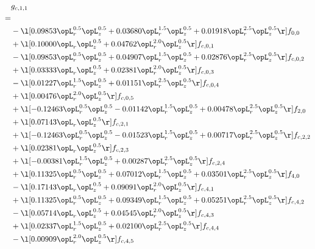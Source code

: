 \begin{alignat}{2} 
\label{eq:g_11_0} 
& g_{c,1,1} \nonumber \\ 
 = \\ 
& - \l[  0.09853 \opL_r^{0.5} \opL_z^{0.5} +  0.03680 \opL_r^{1.5} \opL_z^{0.5} +  0.01918 \opL_r^{2.5} \opL_z^{0.5}  \r] f_{0,0} \nonumber \\ 
& + \l[  0.10000 \opL_r \opL_z^{0.5} +  0.04762 \opL_r^{2.0} \opL_z^{0.5}  \r] f_{c,0,1} \nonumber \\ 
& - \l[  0.09853 \opL_r^{0.5} \opL_z^{0.5} +  0.04907 \opL_r^{1.5} \opL_z^{0.5} +  0.02876 \opL_r^{2.5} \opL_z^{0.5}  \r] f_{c,0,2} \nonumber \\ 
& + \l[  0.03333 \opL_r \opL_z^{0.5} +  0.02381 \opL_r^{2.0} \opL_z^{0.5}  \r] f_{c,0,3} \nonumber \\ 
& - \l[  0.01227 \opL_r^{1.5} \opL_z^{0.5} +  0.01151 \opL_r^{2.5} \opL_z^{0.5}  \r] f_{c,0,4} \nonumber \\ 
& + \l[  0.00476 \opL_r^{2.0} \opL_z^{0.5}  \r] f_{c,0,5} \nonumber \\ 
& + \l[  -0.12463 \opL_r^{0.5} \opL_z^{0.5}   -0.01142 \opL_r^{1.5} \opL_z^{0.5} +  0.00478 \opL_r^{2.5} \opL_z^{0.5}  \r] f_{2,0} \nonumber \\ 
& + \l[  0.07143 \opL_r \opL_z^{0.5}  \r] f_{c,2,1} \nonumber \\ 
& + \l[  -0.12463 \opL_r^{0.5} \opL_z^{0.5}   -0.01523 \opL_r^{1.5} \opL_z^{0.5} +  0.00717 \opL_r^{2.5} \opL_z^{0.5}  \r] f_{c,2,2} \nonumber \\ 
& + \l[  0.02381 \opL_r \opL_z^{0.5}  \r] f_{c,2,3} \nonumber \\ 
& + \l[  -0.00381 \opL_r^{1.5} \opL_z^{0.5} +  0.00287 \opL_r^{2.5} \opL_z^{0.5}  \r] f_{c,2,4} \nonumber \\ 
& + \l[  0.11325 \opL_r^{0.5} \opL_z^{0.5} +  0.07012 \opL_r^{1.5} \opL_z^{0.5} +  0.03501 \opL_r^{2.5} \opL_z^{0.5}  \r] f_{4,0} \nonumber \\ 
& - \l[  0.17143 \opL_r \opL_z^{0.5} +  0.09091 \opL_r^{2.0} \opL_z^{0.5}  \r] f_{c,4,1} \nonumber \\ 
& + \l[  0.11325 \opL_r^{0.5} \opL_z^{0.5} +  0.09349 \opL_r^{1.5} \opL_z^{0.5} +  0.05251 \opL_r^{2.5} \opL_z^{0.5}  \r] f_{c,4,2} \nonumber \\ 
& - \l[  0.05714 \opL_r \opL_z^{0.5} +  0.04545 \opL_r^{2.0} \opL_z^{0.5}  \r] f_{c,4,3} \nonumber \\ 
& + \l[  0.02337 \opL_r^{1.5} \opL_z^{0.5} +  0.02100 \opL_r^{2.5} \opL_z^{0.5}  \r] f_{c,4,4} \nonumber \\ 
& - \l[  0.00909 \opL_r^{2.0} \opL_z^{0.5}  \r] f_{c,4,5} \nonumber \\ 
\end{alignat} 


